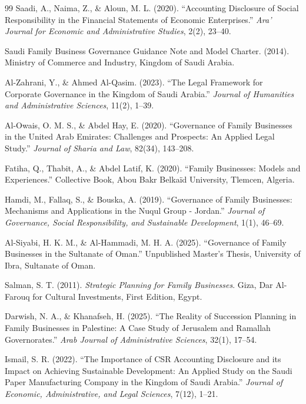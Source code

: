 \documentclass[10pt]{NSP1}
\begin{document}
\begin{thebibliography}{99}
		Saadi, A., Naima, Z., \& Aloun, M. L. (2020). ``Accounting Disclosure of Social Responsibility in the Financial Statements of Economic Enterprises.'' \emph{Ara' Journal for Economic and Administrative Studies}, 2(2), 23--40.
		
		Saudi Family Business Governance Guidance Note and Model Charter. (2014). Ministry of Commerce and Industry, Kingdom of Saudi Arabia.
		
		Al-Zahrani, Y., \& Ahmed Al-Qasim. (2023). ``The Legal Framework for Corporate Governance in the Kingdom of Saudi Arabia.'' \emph{Journal of Humanities and Administrative Sciences}, 11(2), 1--39.
		
		Al-Owais, O. M. S., \& Abdel Hay, E. (2020). ``Governance of Family Businesses in the United Arab Emirates: Challenges and Prospects: An Applied Legal Study.'' \emph{Journal of Sharia and Law}, 82(34), 143--208.
		
		Fatiha, Q., Thabit, A., \& Abdel Latif, K. (2020). ``Family Businesses: Models and Experiences.'' Collective Book, Abou Bakr Belkaïd University, Tlemcen, Algeria.
		
		Hamdi, M., Fallaq, S., \& Bouska, A. (2019). ``Governance of Family Businesses: Mechanisms and Applications in the Nuqul Group - Jordan.'' \emph{Journal of Governance, Social Responsibility, and Sustainable Development}, 1(1), 46--69.
		
		Al-Siyabi, H. K. M., \& Al-Hammadi, M. H. A. (2025). ``Governance of Family Businesses in the Sultanate of Oman.'' Unpublished Master's Thesis, University of Ibra, Sultanate of Oman.
		
		Salman, S. T. (2011). \emph{Strategic Planning for Family Businesses}. Giza, Dar Al-Farouq for Cultural Investments, First Edition, Egypt.
		
		Darwish, N. A., \& Khanafseh, H. (2025). ``The Reality of Succession Planning in Family Businesses in Palestine: A Case Study of Jerusalem and Ramallah Governorates.'' \emph{Arab Journal of Administrative Sciences}, 32(1), 17--54.
		
		Ismail, S. R. (2022). ``The Importance of CSR Accounting Disclosure and its Impact on Achieving Sustainable Development: An Applied Study on the Saudi Paper Manufacturing Company in the Kingdom of Saudi Arabia.'' \emph{Journal of Economic, Administrative, and Legal Sciences}, 7(12), 1--21.
		

\end{thebibliography}
\end{document}
